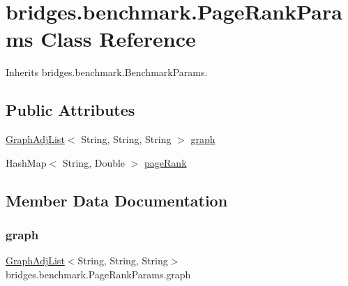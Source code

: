 \hypertarget{classbridges_1_1benchmark_1_1_page_rank_params}{}\section{bridges.\+benchmark.\+Page\+Rank\+Params Class Reference}
\label{classbridges_1_1benchmark_1_1_page_rank_params}


Inherits bridges.\+benchmark.\+Benchmark\+Params.

\subsection*{Public Attributes}
\begin{DoxyCompactItemize}
\item 
\hyperlink{classbridges_1_1base_1_1_graph_adj_list}{Graph\+Adj\+List}$<$ String, String, String $>$ \hyperlink{classbridges_1_1benchmark_1_1_page_rank_params_a5356d0005805dc3a9749e6e7a2659c49}{graph}
\item 
Hash\+Map$<$ String, Double $>$ \hyperlink{classbridges_1_1benchmark_1_1_page_rank_params_aaf852c1fecafa8ed2d222edea9246f7a}{page\+Rank}
\end{DoxyCompactItemize}


\subsection{Member Data Documentation}
\mbox{\label{classbridges_1_1benchmark_1_1_page_rank_params_a5356d0005805dc3a9749e6e7a2659c49}} 
\subsubsection{\texorpdfstring{graph}{graph}}
{\footnotesize\ttfamily \hyperlink{classbridges_1_1base_1_1_graph_adj_list}{Graph\+Adj\+List}$<$String, String, String$>$ bridges.\+benchmark.\+Page\+Rank\+Params.\+graph}

\mbox{\label{classbridges_1_1benchmark_1_1_page_rank_params_aaf852c1fecafa8ed2d222edea9246f7a}} 
